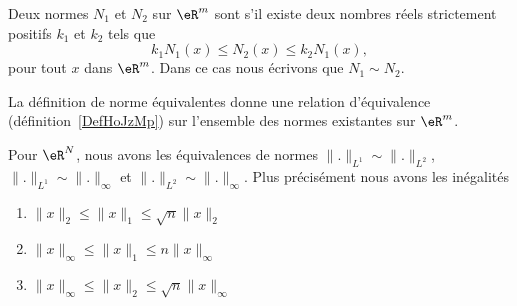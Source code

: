 \begin{definition}		\label{DefEquivNorm}
    Deux normes $N_1$ et $N_2$ sur $\eR^m$ sont  s'il existe deux nombres réels strictement positifs $k_1$ et $k_2$ tels que
	\begin{equation}
		k_1N_1(x)\leq N_2(x)\leq k_2 N_1(x),
	\end{equation}
	pour tout $x$ dans $\eR^m$. Dans ce cas nous écrivons que $N_1\sim N_2$.
\end{definition}

\begin{lemma}       \label{LEMooHAITooWdtLAN}
    La définition de norme équivalentes donne une relation d'équivalence (définition~\ref{DefHoJzMp}) sur l'ensemble des normes existantes sur $\eR^m$.
\end{lemma}

\begin{proposition} \label{PropLJEJooMOWPNi}
    Pour \( \eR^N\), nous avons les équivalences de normes $\| . \|_{L^1}\sim\| . \|_{L^2}$, $\| . \|_{L^1}\sim\| . \|_{\infty}$ et $\| . \|_{L^2}\sim\| . \|_{\infty}$. Plus précisément nous avons les inégalités
    \begin{enumerate}
        \item\label{ItemABSGooQODmLNi}
           $ \| x \|_2\leq \| x \|_1\leq\sqrt{n}\| x \|_2$
        \item\label{ItemABSGooQODmLNii}
            $\| x \|_{\infty}\leq \| x \|_1\leq n \| x \|_{\infty}$
        \item\label{ItemABSGooQODmLNiii}
            $\| x \|_{\infty}\leq \| x \|_2\leq \sqrt{n}\| x \|_{\infty}$
    \end{enumerate}
\end{proposition}


